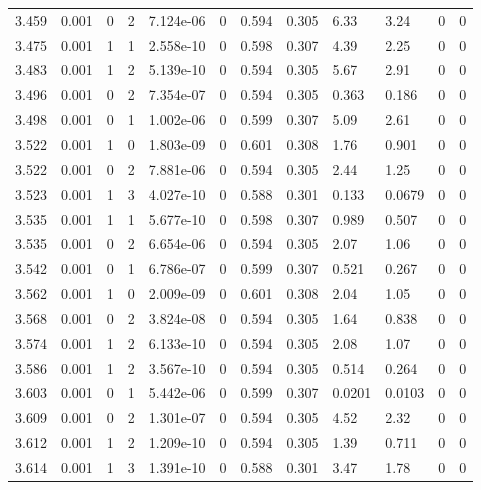 \documentclass[preview]{standalone}
\begin{document}
{{{{{{{{\begin{tabular}{L{1.2cm}C{1.2cm} C{0.3cm}C{0.5cm} C{1.4cm}C{1.4cm} C{1.4cm}C{1.4cm} C{1.6cm}C{1.6cm} C{1.6cm}C{1.6cm}}
  3.459  &  0.001  & 0     &  2 &  7.124e-06  & 0  &  0.594&   0.305& 6.33 & 3.24   &  0 & 0  \\ 
  3.475  &  0.001  & 1     &  1 &  2.558e-10  & 0  &  0.598&   0.307& 4.39 & 2.25   &  0 & 0  \\ 
  3.483  &  0.001  & 1     &  2 &  5.139e-10  & 0  &  0.594&   0.305& 5.67 & 2.91   &  0 & 0  \\ 
  3.496  &  0.001  & 0     &  2 &  7.354e-07  & 0  &  0.594&   0.305& 0.363 & 0.186   &  0 & 0  \\ 
  3.498  &  0.001  & 0     &  1 &  1.002e-06  & 0  &  0.599&   0.307& 5.09 & 2.61   &  0 & 0  \\ 
  3.522  &  0.001  & 1     &  0 &  1.803e-09  & 0  &  0.601&   0.308& 1.76 & 0.901   &  0 & 0  \\ 
  3.522  &  0.001  & 0     &  2 &  7.881e-06  & 0  &  0.594&   0.305& 2.44 & 1.25   &  0 & 0  \\ 
  3.523  &  0.001  & 1     &  3 &  4.027e-10  & 0  &  0.588&   0.301& 0.133 & 0.0679   &  0 & 0  \\ 
  3.535  &  0.001  & 1     &  1 &  5.677e-10  & 0  &  0.598&   0.307& 0.989 & 0.507   &  0 & 0  \\ 
  3.535  &  0.001  & 0     &  2 &  6.654e-06  & 0  &  0.594&   0.305& 2.07 & 1.06   &  0 & 0  \\ 
  3.542  &  0.001  & 0     &  1 &  6.786e-07  & 0  &  0.599&   0.307& 0.521 & 0.267   &  0 & 0  \\ 
  3.562  &  0.001  & 1     &  0 &  2.009e-09  & 0  &  0.601&   0.308& 2.04 & 1.05   &  0 & 0  \\ 
  3.568  &  0.001  & 0     &  2 &  3.824e-08  & 0  &  0.594&   0.305& 1.64 & 0.838   &  0 & 0  \\ 
  3.574  &  0.001  & 1     &  2 &  6.133e-10  & 0  &  0.594&   0.305& 2.08 & 1.07   &  0 & 0  \\ 
  3.586  &  0.001  & 1     &  2 &  3.567e-10  & 0  &  0.594&   0.305& 0.514 & 0.264   &  0 & 0  \\ 
  3.603  &  0.001  & 0     &  1 &  5.442e-06  & 0  &  0.599&   0.307& 0.0201 & 0.0103   &  0 & 0  \\ 
  3.609  &  0.001  & 0     &  2 &  1.301e-07  & 0  &  0.594&   0.305& 4.52 & 2.32   &  0 & 0  \\ 
  3.612  &  0.001  & 1     &  2 &  1.209e-10  & 0  &  0.594&   0.305& 1.39 & 0.711   &  0 & 0  \\ 
  3.614  &  0.001  & 1     &  3 &  1.391e-10  & 0  &  0.588&   0.301& 3.47 & 1.78   &  0 & 0  \\ 

\end{tabular}}}}}}}}}
\end{document}
